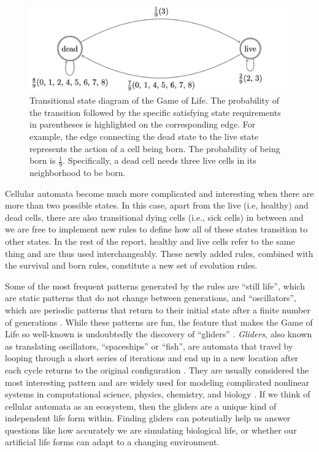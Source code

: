 \documentclass[12pt]{article}
\numberwithin{figure}{section} %
\begin{document}
\begin{figure}[H]
	\centering
	\includegraphics[width=\linewidth]{Section1/3}
	\caption[Transitional state diagram of the Game of Life]{Transitional state diagram of the Game of Life. The probability of the transition followed by the specific satisfying state requirements in parentheses is highlighted on the corresponding edge. For example, the edge connecting the dead state to the live state represents the action of a cell being born. The probability of being born is $\frac{1}{9}$. Specifically, a dead cell needs three live cells in its neighborhood to be born.}
	\label{fig:Transitional state diagram of the Game of Life}
	\vspace{-1.5em}
\end{figure}

Cellular automata become much more complicated and interesting when there are more than two possible states. In this case, apart from the live (i.e, healthy) and dead cells, there are also transitional dying cells (i.e., sick cells) in between and we are free to implement new rules to define how all of these states transition to other states. In the rest of the report, healthy and live cells refer to the same thing and are thus used interchangeably. These newly added rules, combined with the survival and born rules, constitute a new set of evolution rules. 

Some of the most frequent patterns generated by the rules are “still life”, which are static patterns that do not change between generations, and “oscillators”, which are periodic patterns that return to their initial state after a finite number of generations \cite{Cellular automaton}. While these patterns are fun, the feature that makes the Game of Life so well-known is undoubtedly the discovery of “gliders” \cite{Glider}. \textit{Gliders}, also known as translating oscillators, “spaceships” or “fish”, are automata that travel by looping through a short series of iterations and end up in a new location after each cycle returns to the original configuration \cite{rake}. They are usually considered the most interesting pattern and are widely used for modeling complicated nonlinear systems in computational science, physics, chemistry, and biology \cite{Cellular automaton}. If we think of cellular automata as an ecosystem, then the gliders are a unique kind of independent life form within. Finding gliders can potentially help us answer questions like how accurately we are simulating biological life, or whether our artificial life forms can adapt to a changing environment. 
\end{document}
